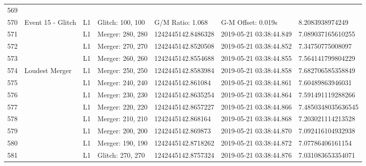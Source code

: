 \begin{longtable}{lllllll}
569  &                                                    &          &                   &                     &                          &                     \\
570  &                                  Event 15 - Glitch &       L1 &  Glitch: 100, 100 &    G/M Ratio: 1.068 &       G-M Offset: 0.019s &     8.2083938974249 \\
571  &                                                    &       L1 &  Merger: 280, 280 &  1242445142.8486328 &  2019-05-21 03:38:44.849 &   7.089037165610255 \\
572  &                                                    &       L1 &  Merger: 270, 270 &  1242445142.8520508 &  2019-05-21 03:38:44.852 &    7.34750775008097 \\
573  &                                                    &       L1 &  Merger: 260, 260 &  1242445142.8554688 &  2019-05-21 03:38:44.855 &   7.564141799804229 \\
574  &                                     Loudest Merger &       L1 &  Merger: 250, 250 &  1242445142.8583984 &  2019-05-21 03:38:44.858 &   7.682706585358849 \\
575  &                                                    &       L1 &  Merger: 240, 240 &   1242445142.861084 &  2019-05-21 03:38:44.861 &    7.60489863946031 \\
576  &                                                    &       L1 &  Merger: 230, 230 &  1242445142.8635254 &  2019-05-21 03:38:44.864 &   7.591491119288266 \\
577  &                                                    &       L1 &  Merger: 220, 220 &  1242445142.8657227 &  2019-05-21 03:38:44.866 &  7.4850348035636545 \\
578  &                                                    &       L1 &  Merger: 210, 210 &   1242445142.868164 &  2019-05-21 03:38:44.868 &   7.203021114213528 \\
579  &                                                    &       L1 &  Merger: 200, 200 &   1242445142.869873 &  2019-05-21 03:38:44.870 &   7.092416104932938 \\
580  &                                                    &       L1 &  Merger: 190, 190 &  1242445142.8718262 &  2019-05-21 03:38:44.872 &    7.07786406161154 \\
581  &                                                    &       L1 &  Glitch: 270, 270 &  1242445142.8757324 &  2019-05-21 03:38:44.876 &   7.031083653354071 \\

\end{longtable}
